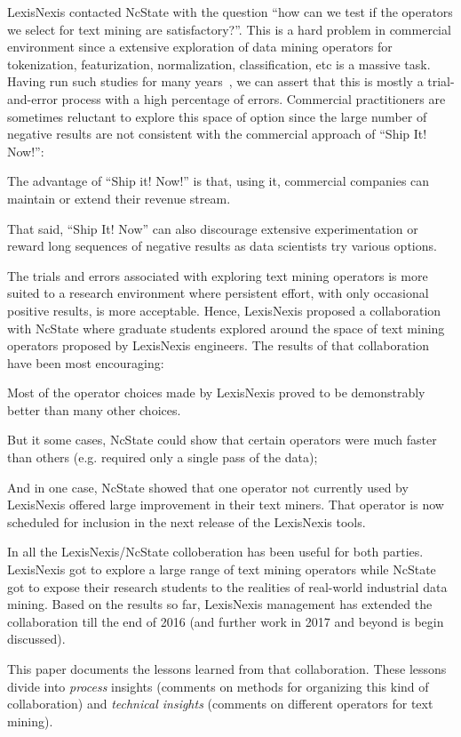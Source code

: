 \documentclass{sig-alternate-05-2015}
\newcommand{\bi}{\begin{itemize*}}
\newcommand{\ei}{\end{itemize*}}
\begin{document}
LexisNexis contacted NcState with the question ``how can
we test if the operators we select for text mining are 
satisfactory?''. This is a hard problem in commercial
environment since a
extensive exploration of  data mining operators for
tokenization, featurization, normalization, classification, etc
is a massive task. Having run such studies for many years~\cite{menzies2014sharing},
we can assert that this is mostly a trial-and-error process
with a high percentage of errors. Commercial practitioners
are sometimes reluctant to explore this  space of option
since the large number of negative results are not consistent
with the commercial approach of ``Ship It! Now!'':
\bi
\item
The advantage
of ``Ship it! Now!'' is that, using it,  commercial companies can maintain
or extend their revenue stream.
\item
That said, ``Ship It! Now''
can also discourage extensive experimentation or reward  long sequences
of negative results as data scientists try various options.
\ei
The trials and errors associated with exploring text mining operators
is more suited to a research environment where persistent effort, with only occasional positive results, is more acceptable. Hence,
LexisNexis proposed a collaboration with NcState where 
graduate students explored around the space of text mining
operators proposed by 
LexisNexis engineers. The results of that collaboration have
been most encouraging:
\bi
\item 
Most  of the operator choices made by LexisNexis proved
to be demonstrably better than many other choices.
\item 
But it some cases, NcState could show that certain operators
were much faster than others (e.g. required only a single pass
of the data);
\item
And in one case, NcState showed that one operator not currently
used by LexisNexis offered large improvement in their text miners.
That operator is now scheduled for inclusion in the next release
of the LexisNexis tools.
\ei
In all the LexisNexis/NcState colloberation has been useful
for both parties.
LexisNexis got to explore a large range of text mining operators while
NcState got to expose their research students to the
realities of real-world industrial data mining.
Based on  the results so far, LexisNexis management has extended the collaboration till the end of 2016 (and further work in 2017
and beyond is begin discussed). 




This paper documents the lessons learned from that collaboration.
These lessons divide into {\em process} insights (comments
on methods for organizing this kind of collaboration) and {\em technical
insights} (comments on different operators for text mining).
 
\end{document}
